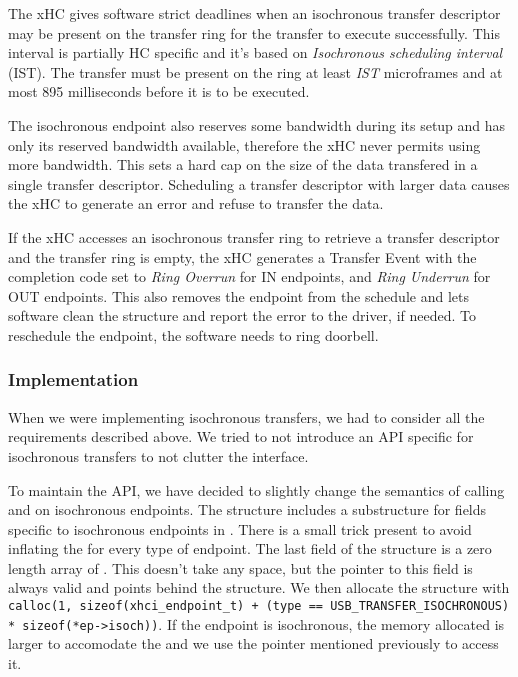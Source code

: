 The xHC gives software strict deadlines when an isochronous transfer descriptor
may be present on the transfer ring for the transfer to execute successfully.
This interval is partially HC specific and it's based on \textit{Isochronous
scheduling interval} (IST). The transfer must be present on the ring at least
\textit{IST} microframes and at most 895 milliseconds before it is to be
executed.

The isochronous endpoint also reserves some bandwidth during its setup and has
only its reserved bandwidth available, therefore the xHC never permits using
more bandwidth. This sets a hard cap on the size of the data transfered in a
single transfer descriptor. Scheduling a transfer descriptor with larger data
causes the xHC to generate an error and refuse to transfer the data.

If the xHC accesses an isochronous transfer ring to retrieve a transfer
descriptor and the transfer ring is empty, the xHC generates a Transfer Event
with the completion code set to \textit{Ring Overrun} for IN endpoints, and
\textit{Ring Underrun} for OUT endpoints. This also removes the endpoint from
the schedule and lets software clean the structure and report the error to the
driver, if needed. To reschedule the endpoint, the software needs to ring
doorbell.

\subsubsection{Implementation}

When we were implementing isochronous transfers, we had to consider all the
requirements described above. We tried to not introduce an API specific for
isochronous transfers to not clutter the interface.

To maintain the  API, we have decided to slightly change the
semantics of calling  and  on isochronous
endpoints. The  structure includes a substructure for
fields specific to isochronous endpoints in . There is a
small trick present to avoid inflating the  for every
type of endpoint. The last field of the structure is a zero length array of
. This doesn't take any space, but the pointer to this
field is always valid and points behind the structure. We then allocate the
structure with \texttt{calloc(1, sizeof(xhci\_endpoint\_t) + (type ==
USB\_TRANSFER\_ISOCHRONOUS) * sizeof(*ep->isoch))}. If the endpoint is
isochronous, the memory allocated is larger to accomodate the
 and we use the pointer mentioned previously to access it.

